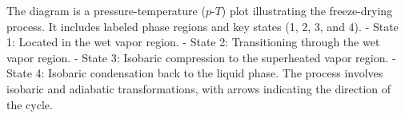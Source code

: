 The diagram is a pressure-temperature (\( p \)-\( T \)) plot illustrating the freeze-drying process. It includes labeled phase regions and key states (1, 2, 3, and 4).  
- State 1: Located in the wet vapor region.  
- State 2: Transitioning through the wet vapor region.  
- State 3: Isobaric compression to the superheated vapor region.  
- State 4: Isobaric condensation back to the liquid phase.  
The process involves isobaric and adiabatic transformations, with arrows indicating the direction of the cycle.